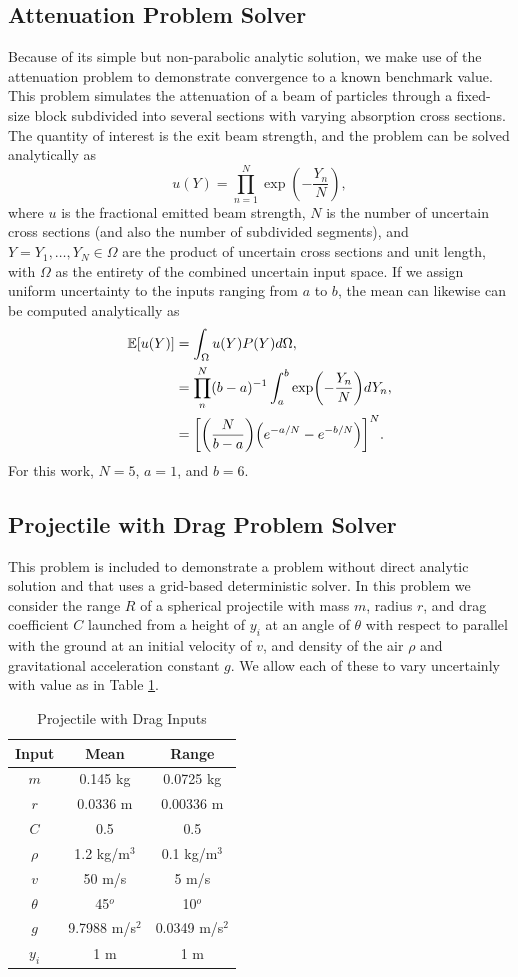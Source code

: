 \documentclass[11pt]{article}
\newcommand{\expv}[1]{\ensuremath{\mathbb{E}[ #1]}}
\begin{document}
\subsection{Attenuation Problem Solver}
Because of its simple but non-parabolic analytic solution, we make use of the attenuation problem to demonstrate convergence to a known benchmark value.  This problem simulates the attenuation of a beam of particles through a fixed-size block subdivided into several sections with varying absorption cross sections.  The quantity of interest is the exit beam strength, and the problem can be solved analytically as
\begin{equation}
u(Y) = \prod_{n=1}^N \exp(-\frac{Y_n}{N}),
\end{equation}
where $u$ is the fractional emitted beam strength, $N$ is the number of uncertain cross sections (and also the number of subdivided segments), and $Y={Y_1,\ldots,Y_N}\in\Omega$ are the product of uncertain cross sections and unit length, with $\Omega$ as the entirety of the combined uncertain input space.  If we assign uniform uncertainty to the inputs ranging from $a$ to $b$, the mean can likewise can be computed analytically as
\begin{align}
\expv{u(Y)}&=\int_\Omega u(Y)P(Y) d\Omega,\\
    &=\prod_n^N (b-a)^{-1}\int_a^b \exp(-\frac{Y_n}{N}) dY_n,\\
    &=\qty[\qty(\frac{N}{b-a})\qty(e^{-a/N}-e^{-b/N})]^N.
\end{align}
For this work, $N=5$, $a=1$, and $b=6$.

\subsection{Projectile with Drag Problem Solver}
This problem is included to demonstrate a problem without direct analytic solution and that uses a grid-based deterministic solver.  In this problem we consider the range $R$ of a spherical projectile with mass $m$, radius $r$, and drag coefficient $C$ launched from a height of $y_i$ at an angle of $\theta$ with respect to parallel with the ground at an initial velocity of $v$, and density of the air $\rho$ and gravitational acceleration constant $g$.  We allow each of these to vary uncertainly with value as in Table \ref{proj init}.
\begin{table}[h]
\centering
\begin{tabular}{c | c c}
Input & Mean & Range \\ \hline
$m$ & 0.145 kg & 0.0725 kg\\
$r$ & 0.0336 m & 0.00336 m \\
$C$ & 0.5 & 0.5 \\
$\rho$ & 1.2 kg/m$^3$ & 0.1 kg/m$^3$\\
$v$ & 50 m/s & 5 m/s \\
$\theta$ & 45$^o$ & 10$^o$ \\
$g$ & 9.7988 m/s$^2$ & 0.0349 m/s$^2$\\
$y_i$ & 1 m & 1 m
\end{tabular}
\caption{Projectile with Drag Inputs}
\label{proj init}
\end{table}
\end{document}
